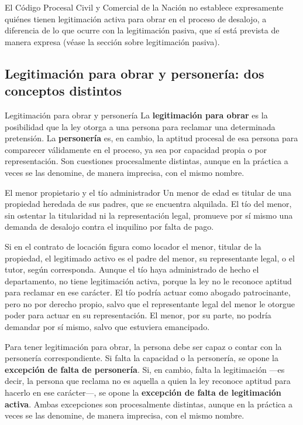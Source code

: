\documentclass[12pt,oneside]{book}
\begin{document}
\begin{normacitada}
El Código Procesal Civil y Comercial de la Nación no establece expresamente quiénes tienen legitimación activa para obrar en el proceso de desalojo, a diferencia de lo que ocurre con la legitimación pasiva, que sí está prevista de manera expresa (véase la sección sobre legitimación pasiva).
\end{normacitada}

\subsection{Legitimación para obrar y personería: dos conceptos distintos}

\begin{definition}{Legitimación para obrar y personería}
La \textbf{legitimación para obrar} es la posibilidad que la ley otorga a una persona para reclamar una determinada pretensión. La \textbf{personería} es, en cambio, la aptitud procesal de esa persona para comparecer válidamente en el proceso, ya sea por capacidad propia o por representación. Son cuestiones procesalmente distintas, aunque en la práctica a veces se las denomine, de manera imprecisa, con el mismo nombre.
\end{definition}

\begin{example}{El menor propietario y el tío administrador}
Un menor de edad es titular de una propiedad heredada de sus padres, que se encuentra alquilada. El tío del menor, sin ostentar la titularidad ni la representación legal, promueve por sí mismo una demanda de desalojo contra el inquilino por falta de pago.

Si en el contrato de locación figura como locador el menor, titular de la propiedad, el legitimado activo es el padre del menor, su representante legal, o el tutor, según corresponda. Aunque el tío haya administrado de hecho el departamento, no tiene legitimación activa, porque la ley no le reconoce aptitud para reclamar en ese carácter. El tío podría actuar como abogado patrocinante, pero no por derecho propio, salvo que el representante legal del menor le otorgue poder para actuar en su representación. El menor, por su parte, no podría demandar por sí mismo, salvo que estuviera emancipado.
\end{example}

\begin{important}
Para tener legitimación para obrar, la persona debe ser capaz o contar con la personería correspondiente. Si falta la capacidad o la personería, se opone la \textbf{excepción de falta de personería}. Si, en cambio, falta la legitimación ---es decir, la persona que reclama no es aquella a quien la ley reconoce aptitud para hacerlo en ese carácter---, se opone la \textbf{excepción de falta de legitimación activa}. Ambas excepciones son procesalmente distintas, aunque en la práctica a veces se las denomine, de manera imprecisa, con el mismo nombre.
\end{important}
\end{document}
